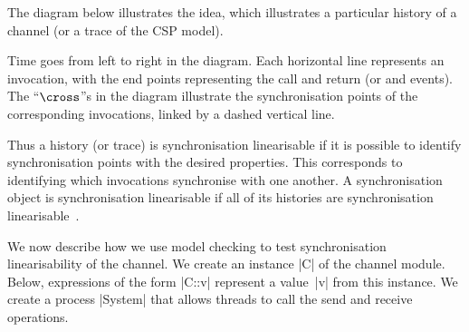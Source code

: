 The diagram below illustrates the idea, which illustrates a particular history
of a channel (or a trace of the CSP model).
%
\begin{center}
\unScalaMid
{}
\scalaMid
\end{center}
%
Time goes from left to right in the diagram.  Each horizontal line represents
an invocation, with the end points representing the call and return (or
 and  events).  The ``$\cross$''s in the diagram
illustrate the synchronisation points of the corresponding invocations, linked
by a dashed vertical line.

Thus a history (or trace) is synchronisation linearisable if it is possible to
identify synchronisation points with the desired properties.  This corresponds
to identifying which invocations synchronise with one another.  A
synchronisation object is synchronisation linearisable if all of its histories
are synchronisation linearisable~\cite{LL:synchronisation}.


\inlineCSP

We now describe how we use model checking to test synchronisation
linearisability of the channel.  We create an instance |C| of the channel
module.  Below, expressions of the form |C::v| represent a value~|v| from this
instance.  We create a process |System| that allows threads to call the send
and receive operations.

